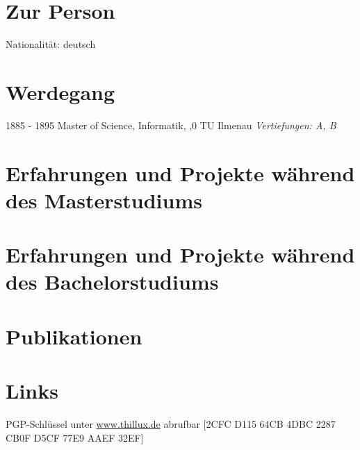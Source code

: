 \documentclass[a4paper]{thillux-cv}
\begin{document}

\section{Zur Person}
\keywordEntry
	{Nationalität:}
	{deutsch}

\section{Werdegang}

\dateEntry
    {1885 - 1895}
    {Master of Science, Informatik, ,0}
    {TU Ilmenau}
    {\emph{Vertiefungen: A, B}}


\section{Erfahrungen und Projekte während des Masterstudiums}

\section{Erfahrungen und Projekte während des Bachelorstudiums}

\section{Publikationen}
\renewcommand\refname{\vskip -1.5cm}


\nocite{*}

\section{Links}
\begin{tightemize}
	\item PGP-Schlüssel unter \href{https://www.thillux.de}{www.thillux.de} abrufbar \hfill [2CFC D115 64CB 4DBC 2287 CB0F D5CF 77E9 AAEF 32EF]%
\end{tightemize}
\end{document}
